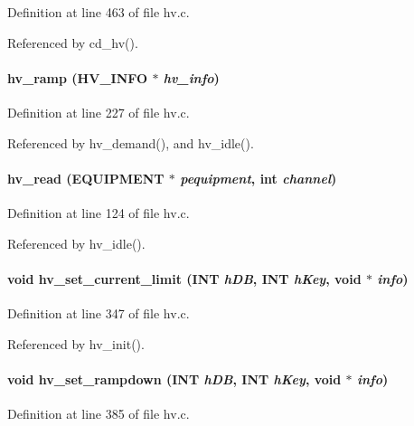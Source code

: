 Definition at line 463 of file hv.c.

Referenced by cd\_\-hv().
\paragraph[{hv\_\-ramp}]{ hv\_\-ramp ({\bf HV\_\-INFO} $\ast$ {\em hv\_\-info})}\hfill\label{hv_8c_af87c3c364f95d9ef5dd7bf0602c1b7bd}


Definition at line 227 of file hv.c.

Referenced by hv\_\-demand(), and hv\_\-idle().
\paragraph[{hv\_\-read}]{ hv\_\-read ({\bf EQUIPMENT} $\ast$ {\em pequipment}, \/  int {\em channel})}\hfill\label{hv_8c_adf53cc684488e64813243dafb3649712}


Definition at line 124 of file hv.c.

Referenced by hv\_\-idle().
\paragraph[{hv\_\-set\_\-current\_\-limit}]{\setlength{\rightskip}{0pt plus 5cm}void hv\_\-set\_\-current\_\-limit ({\bf INT} {\em hDB}, \/  {\bf INT} {\em hKey}, \/  void $\ast$ {\em info})}\hfill\label{hv_8c_aad24ee51a854f8e3d655e11f1b87ad1a}


Definition at line 347 of file hv.c.

Referenced by hv\_\-init().
\paragraph[{hv\_\-set\_\-rampdown}]{\setlength{\rightskip}{0pt plus 5cm}void hv\_\-set\_\-rampdown ({\bf INT} {\em hDB}, \/  {\bf INT} {\em hKey}, \/  void $\ast$ {\em info})}\hfill\label{hv_8c_a035e3d5e825a2e7537549cbc9133957c}


Definition at line 385 of file hv.c.

